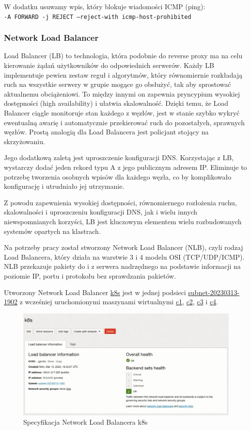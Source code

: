 \noindent W dodatku usuwamy wpis, który blokuje wiadomości ICMP (ping):\\
\texttt{-A FORWARD -j REJECT --reject-with icmp-host-prohibited}

\subsubsection{Network Load Balancer}

Load Balancer (LB) to technologia, która podobnie do reverse proxy ma na celu kierowanie żądań użytkowników do odpowiednich serwerów.
Każdy LB implementuje pewien zestaw reguł i algorytmów, który równomiernie rozkładają ruch na wszystkie serwery w grupie mogące go obsłużyć, tak aby sprostować aktualnemu obciążeniowi.
To między innymi on zapewnia pryncypium wysokiej dostępności (high availability) i ułatwia skalowalność.
Dzięki temu, że Load Balancer ciągle monitoruje stan każdego z węzłów, jest w stanie szybko wykryć ewentualną awarię i automatycznie przekierować ruch do pozostałych, sprawnych węzłów.
Prostą analogią dla Load Balancera jest policjant stojący na skrzyżowaniu.

Jego dodatkową zaletą jest uproszczenie konfiguracji DNS. Korzystając z LB, wystarczy dodać jeden rekord typu A z jego publicznym adresem IP\@.
Eliminuje to potrzebę tworzenia osobnych wpisów dla każdego węzła, co by komplikowało konfigurację i utrudniało jej utrzymanie.

Z powodu zapewnienia wysokiej dostępności, równomiernego rozłożenia ruchu, skalowalności i uproszczeniu konfiguracji DNS, jak i wielu innych niewspomnianych korzyści, LB jest kluczowym elementem wielu rozbudowanych systemów opartych na klastrach.

Na potrzeby pracy został stworzony Network Load Balancer (NLB), czyli rodzaj Load Balancera, który działa na warstwie 3 i 4 modelu OSI (TCP/UDP/ICMP).
NLB przekazuje pakiety do i z serwera nadrzędnego na podstawie informacji na poziomie IP, portu i protokołu bez sprawdzania pakietów.

Utworzony Network Load Balancer \url{k8s} jest w jednej podsieci \url{subnet-20230313-1902} z wcześniej uruchomionymi maszynami wirtualnymi \url{c1}, \url{c2}, \url{c3} i \url{c4}.

\begin{figure}[H]
    \centering
    \includegraphics[width=\textwidth]{img/oci-network-load-balancer-k8s}
    \caption{Specyfikacja Network Load Balancera k8s}
    \label{fig:oci-network-load-balancer-k8s}
\end{figure}


